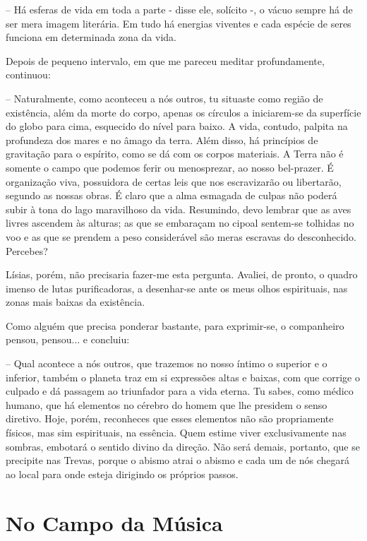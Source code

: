 \documentclass[portuguese,12pt,a4paper]{scrbook}
\begin{document}
	– Há esferas de vida em toda a parte - disse ele, solícito -, o vácuo sempre há de ser mera imagem literária. Em tudo há energias viventes e cada espécie de seres funciona em determinada zona da vida.
	
	Depois de pequeno intervalo, em que me pareceu meditar profundamente, continuou:
	
	– Naturalmente, como aconteceu a nós outros, tu situaste como região de existência, além da morte do corpo, apenas os círculos a iniciarem-se da superfície do globo para cima, esquecido do nível para baixo. A vida, contudo, palpita na profundeza dos mares e no âmago da terra. Além disso, há princípios de gravitação para o espírito, como se dá com os corpos materiais. A Terra não é somente o campo que podemos ferir ou menosprezar, ao nosso bel-prazer. É organização viva, possuidora de certas leis que nos escravizarão ou libertarão, segundo as nossas obras. É claro que a alma esmagada de culpas não poderá subir à tona do lago maravilhoso da vida. Resumindo, devo lembrar que as aves livres ascendem às alturas; as que se embaraçam no cipoal sentem-se tolhidas no voo e as que se prendem a peso considerável são meras escravas do desconhecido. Percebes?
	
	
	Lísias, porém, não precisaria fazer-me esta pergunta. Avaliei, de pronto, o quadro imenso de lutas purificadoras, a desenhar-se ante os meus olhos espirituais, nas zonas mais baixas da existência.
	
	Como alguém que precisa ponderar bastante, para exprimir-se, o companheiro pensou, pensou... e concluiu:
	
	– Qual acontece a nós outros, que trazemos no nosso íntimo o superior e o inferior, também o planeta traz em si expressões altas e baixas, com que corrige o culpado e dá passagem ao triunfador para a vida eterna. Tu sabes, como médico humano, que há elementos no cérebro do homem que lhe presidem o senso diretivo. Hoje, porém, reconheces que esses elementos não são propriamente físicos, mas sim espirituais, na essência. Quem estime viver exclusivamente nas sombras, embotará o sentido divino da direção. Não será demais, portanto, que se precipite nas Trevas, porque o abismo atrai o abismo e cada um de nós chegará ao local para onde esteja dirigindo os próprios passos.
	
	
	\chapter{No Campo da Música}
	
\end{document}
